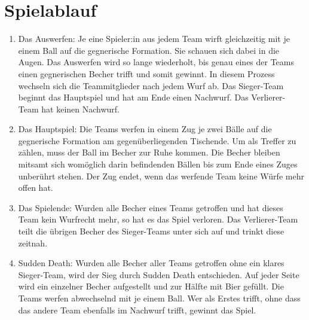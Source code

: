 \section{Spielablauf}\label{Bier-Pong:Spielablauf}
\begin{enumerate}[label={(\arabic*)}]
    \item
    Das Auswerfen: Je eine Spieler:in aus jedem Team wirft gleichzeitig mit je einem Ball auf die gegnerische Formation.
    Sie schauen sich dabei in die Augen. Das Auswerfen wird so lange wiederholt, bis genau eines der Teams einen gegnerischen Becher trifft und somit gewinnt.
    In diesem Prozess wechseln sich die Teammitglieder nach jedem Wurf ab.
    Das Sieger-Team beginnt das Hauptspiel und hat am Ende einen Nachwurf.
    Das Verlierer-Team hat keinen Nachwurf.

    \item
    Das Hauptspiel: Die Teams werfen in einem Zug je zwei Bälle auf die gegnerische Formation am gegenüberliegenden Tischende.
    Um als Treffer zu zählen, muss der Ball im Becher zur Ruhe kommen.
    Die Becher bleiben mitsamt sich womöglich darin befindenden Bällen bis zum Ende eines Zuges unberührt stehen.
    Der Zug endet, wenn das werfende Team keine Würfe mehr offen hat.

    \item
    Das Spielende: Wurden alle Becher eines Teams getroffen und hat dieses Team kein Wurfrecht mehr, so hat es das Spiel verloren.
    Das Verlierer-Team teilt die übrigen Becher des Sieger-Teams unter sich auf und trinkt diese zeitnah.

    \item
    \glqq{}Sudden Death\grqq{}: Wurden alle Becher aller Teams getroffen ohne ein klares Sieger-Team, wird der Sieg durch Sudden Death entschieden.
    Auf jeder Seite wird ein einzelner Becher aufgestellt und zur Hälfte mit Bier gefüllt.
    Die Teams werfen abwechselnd mit je einem Ball.
    Wer als Erstes trifft, ohne dass das andere Team ebenfalls im Nachwurf trifft, gewinnt das Spiel.
\end{enumerate}
    
